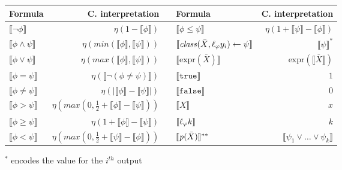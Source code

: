 
\begin{table}
    \centering
    \begin{tabular}{l|r||cl|r}
        \textbf{Formula} & \textbf{C. interpretation} & & \textbf{Formula} & \textbf{C. interpretation}
        \\
        \hline\hline
        $\llbracket\neg \phi\rrbracket$ & $\eta(1 - \llbracket\phi\rrbracket)$ & & $\llbracket\phi \le \psi\rrbracket$  & $\eta(1 + \llbracket \psi \rrbracket - \llbracket \phi \rrbracket)$  %
        \\
        $\llbracket\phi  \wedge \psi\rrbracket$ &  $\eta(min(\llbracket\phi\rrbracket, \llbracket\psi\rrbracket))$ & &  $\llbracket \mathit{class}(\bar{X}, \ell_{\varphi}{y}_i) \leftarrow \psi \rrbracket$ & $\llbracket \psi \rrbracket^{*}$ %
        \\
        $\llbracket\phi  \vee \psi\rrbracket$ & $\eta(max(\llbracket\phi\rrbracket, \llbracket\psi\rrbracket))$ & & $\llbracket \text{expr}(\bar{X}) \rrbracket$ & $\text{expr}(\llbracket\bar{X}\rrbracket)$ %
        \\
        $\llbracket\phi = \psi\rrbracket$ & $\eta(\llbracket\neg( \phi \ne \psi )\rrbracket )$ & &$\llbracket \mathtt{true} \rrbracket$ & $1$ %
        \\
        $\llbracket\phi \ne \psi\rrbracket$ & $\eta(|\llbracket\phi\rrbracket-\llbracket\psi\rrbracket|)$ & & $\llbracket \mathtt{false} \rrbracket$ & $0$ %
        \\
        $\llbracket\phi > \psi\rrbracket$ & $\eta(max(0, \frac{1}{2} + \llbracket\phi\rrbracket - \llbracket\psi\rrbracket))$ & & $\llbracket X \rrbracket$ & $x$ %
        \\
        $\llbracket\phi \ge \psi\rrbracket$  & $\eta(1 + \llbracket \phi \rrbracket - \llbracket \psi \rrbracket)$ & & $\llbracket \ell_{\varphi}{k} \rrbracket$ & $k$ %
        \\
        $\llbracket\phi < \psi\rrbracket$  &  $\eta(max(0, \frac{1}{2} + \llbracket\psi\rrbracket - \llbracket\phi\rrbracket))$ & & $\llbracket \mathit{p}(\bar{X}) \rrbracket^{**}$ & $\llbracket \psi_1 \vee \ldots \vee \psi_k \rrbracket$ %
    \end{tabular}
    \begin{center}\scriptsize
        $^{*}$ encodes the value for the $i^{th}$ output
        \\

\end{center}
\end{table}
